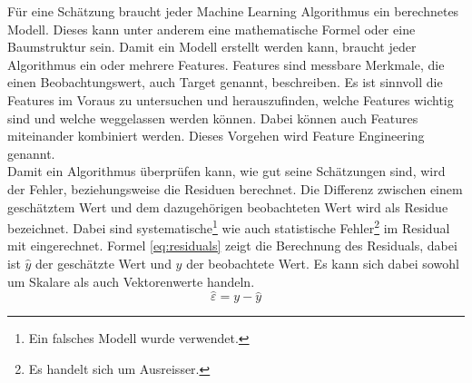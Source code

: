 Für eine Schätzung braucht jeder Machine Learning Algorithmus ein berechnetes Modell. Dieses kann unter anderem eine mathematische Formel oder eine Baumstruktur sein. Damit ein Modell erstellt werden kann, braucht jeder Algorithmus ein oder mehrere Features. Features sind messbare Merkmale, die einen Beobachtungswert, auch Target genannt, beschreiben. Es ist sinnvoll die Features im Voraus zu untersuchen und herauszufinden, welche Features wichtig sind und welche weggelassen werden können. Dabei können auch Features miteinander kombiniert werden. Dieses Vorgehen wird Feature Engineering genannt.\\[2ex]
%
Damit ein Algorithmus überprüfen kann, wie gut seine Schätzungen sind, wird der Fehler, beziehungsweise die Residuen berechnet. Die Differenz zwischen einem geschätztem Wert und dem dazugehörigen beobachteten Wert wird als Residue bezeichnet. Dabei sind systematische\footnote{Ein falsches Modell wurde verwendet.} wie auch statistische Fehler\footnote{Es handelt sich um Ausreisser.} im Residual mit  eingerechnet. Formel \eqref{eq:residuals} zeigt die Berechnung des Residuals, dabei ist $\hat{y}$ der geschätzte Wert und $y$ der beobachtete Wert. Es kann sich dabei sowohl um Skalare als auch Vektorenwerte handeln.\\
\begin{equation}
\label{eq:residuals}
\hat{\varepsilon} = y - \hat{y}
\end{equation}
%
\begin{table}[h]\label{tab:error_models}
\centering
{}
\caption{Fehlermodelle mit Formelen}
\end{table}

